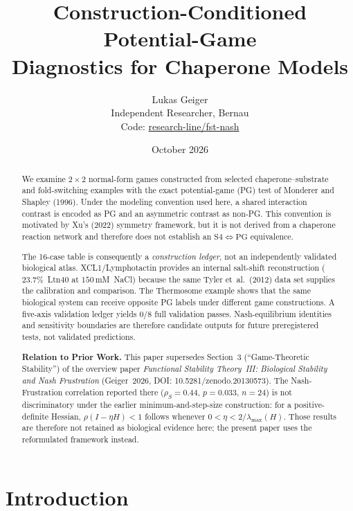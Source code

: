 \documentclass[12pt,a4paper]{article}
\title{Construction-Conditioned Potential-Game\\
Diagnostics for Chaperone Models}
\author{Lukas Geiger\\
\small Independent Researcher, Bernau\\
\small Code: \href{https://github.com/research-line/fst-nash}{research-line/fst-nash}}
\date{October 2026}
\begin{document}
\maketitle

\begin{abstract}
We examine $2\times 2$ normal-form games constructed from selected
chaperone--substrate and fold-switching examples with the exact
potential-game (PG) test of Monderer and Shapley (1996). Under the
modeling convention used here, a shared interaction contrast is encoded
as PG and an asymmetric contrast as non-PG. This convention is motivated
by Xu's (2022) symmetry framework, but it is not derived from a
chaperone reaction network and therefore does not establish an
$\mathrm{S4}\iff\mathrm{PG}$ equivalence.

The 16-case table is consequently a \emph{construction ledger}, not an
independently validated biological atlas. XCL1/\allowbreak Lymphotactin
provides an internal salt-shift reconstruction ($23.7\%$~Ltn40 at
$150$\,mM~NaCl) because the same Tyler et~al.\ (2012) data set supplies
the calibration and comparison. The Thermosome example shows that the
same biological system can receive opposite PG labels under different
game constructions. A five-axis validation ledger yields $0/8$ full
validation passes. Nash-equilibrium identities and sensitivity
boundaries are therefore candidate outputs for future preregistered
tests, not validated predictions.

\medskip\noindent
\textbf{Relation to Prior Work.}
This paper supersedes Section~3 (``Game-Theoretic Stability'') of the
overview paper \emph{Functional Stability Theory~III: Biological Stability
and Nash Frustration} (Geiger~2026, DOI: 10.5281/zenodo.20130573).
The Nash-Frustration correlation reported there ($\rho_S = 0.44$,
$p = 0.033$, $n = 24$) is not discriminatory under the earlier
minimum-and-step-size construction: for a positive-definite Hessian,
$\rho(I-\eta H)<1$ follows whenever
$0<\eta<2/\lambda_{\max}(H)$. Those results are therefore not retained
as biological evidence here; the present paper uses the reformulated
framework instead.
\end{abstract}

\clearpage
\begingroup
\small
\setlength{\parskip}{0pt}
\tableofcontents
\endgroup
\clearpage


\section{Introduction}
\label{sec:intro}
\end{document}
